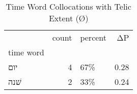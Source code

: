 \begin{table}[htbp!]
\centering
\caption{Time Word Collocations with Telic Extent (Ø)}
\label{table:telicØ_head_cpd}
\begin{tabular}{lrlr}
\toprule
{} &  count & percent &    ΔP \\
time word &        &         &       \\
\midrule
יום       &      4 &     67\% &  0.28 \\
שׁנה      &      2 &     33\% &  0.24 \\
\bottomrule
\end{tabular}
\end{table}
